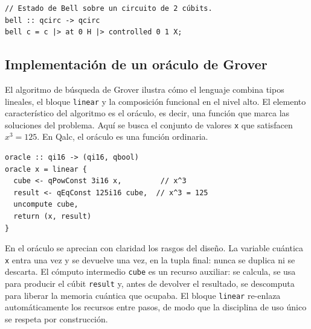 \begin{lstlisting}[language={}, caption=Circuito de Bell implementado en Qalc]
// Estado de Bell sobre un circuito de 2 cúbits.
bell :: qcirc -> qcirc
bell c = c |> at 0 H |> controlled 0 1 X;
\end{lstlisting}

\subsection{Implementación de un oráculo de Grover}

El algoritmo de búsqueda de Grover ilustra cómo el lenguaje combina tipos lineales, el bloque \lstinline|linear| y la composición funcional en el nivel alto. El elemento característico del algoritmo es el oráculo, es decir, una función que marca las soluciones del problema. Aquí se busca el conjunto de valores \lstinline|x| que satisfacen $x^3 = 125$. En Qalc, el oráculo es una función ordinaria.

\begin{lstlisting}[language={}, caption={Oráculo de Grover para la condición $x^3 = 125$}]
oracle :: qi16 -> (qi16, qbool)
oracle x = linear {
  cube <- qPowConst 3i16 x,         // x^3
  result <- qEqConst 125i16 cube,  // x^3 = 125
  uncompute cube,
  return (x, result)
}
\end{lstlisting}

En el oráculo se aprecian con claridad los rasgos del diseño. La variable cuántica \lstinline|x| entra una vez y se devuelve una vez, en la tupla final: nunca se duplica ni se descarta. El cómputo intermedio \lstinline|cube| es un recurso auxiliar: se calcula, se usa para producir el cúbit \lstinline|result| y, antes de devolver el resultado, se descomputa para liberar la memoria cuántica que ocupaba. El bloque \lstinline|linear| re-enlaza automáticamente los recursos entre pasos, de modo que la disciplina de uso único se respeta por construcción.
